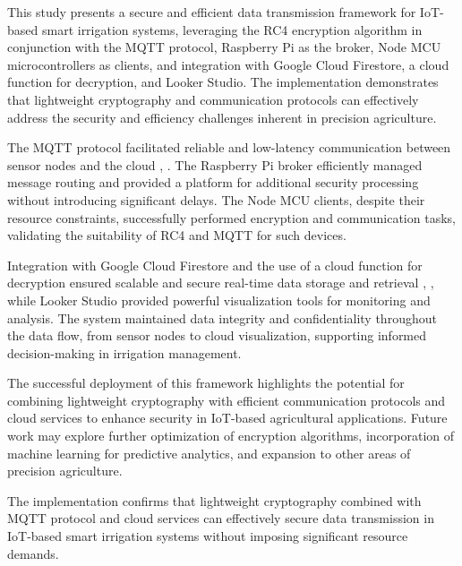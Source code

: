 \documentclass[conference]{IEEEtran}
\begin{document}
This study presents a secure and efficient data transmission framework for IoT-based smart irrigation systems, leveraging the RC4 encryption algorithm in conjunction with the MQTT protocol, Raspberry Pi as the broker, Node MCU microcontrollers as clients, and integration with Google Cloud Firestore, a cloud function for decryption, and Looker Studio. The implementation demonstrates that lightweight cryptography and communication protocols can effectively address the security and efficiency challenges inherent in precision agriculture.

The MQTT protocol facilitated reliable and low-latency communication between sensor nodes and the cloud \cite{ref5}, \cite{ref11}. The Raspberry Pi broker efficiently managed message routing and provided a platform for additional security processing without introducing significant delays. The Node MCU clients, despite their resource constraints, successfully performed encryption and communication tasks, validating the suitability of RC4 and MQTT for such devices.

Integration with Google Cloud Firestore and the use of a cloud function for decryption ensured scalable and secure real-time data storage and retrieval \cite{ref14}, \cite{ref18}, while Looker Studio provided powerful visualization tools for monitoring and analysis. The system maintained data integrity and confidentiality throughout the data flow, from sensor nodes to cloud visualization, supporting informed decision-making in irrigation management.

The successful deployment of this framework highlights the potential for combining lightweight cryptography with efficient communication protocols and cloud services to enhance security in IoT-based agricultural applications. Future work may explore further optimization of encryption algorithms, incorporation of machine learning for predictive analytics, and expansion to other areas of precision agriculture.

The implementation confirms that lightweight cryptography combined with MQTT protocol and cloud services can effectively secure data transmission in IoT-based smart irrigation systems without imposing significant resource demands.
\end{document}
